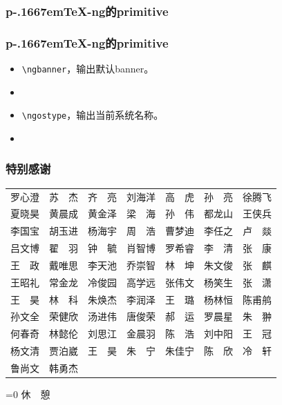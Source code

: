 \documentclass[dvipdfmx]{beamer}
\newcommand{\pTeX}{p\kern-.1667em\TeX}
\newcommand{\ptexng}{\pTeX-ng}
\begin{document}
%
\begin{frame}[fragile]
\frametitle{\bf \ptexng 的primitive}
\end{frame}
%
\begin{frame}[fragile]
\frametitle{\bf \ptexng 的primitive}
\begin{itemize}
\item \verb!\ngbanner!，输出默认banner。
\item \ngbanner
\item \verb!\ngostype!，输出当前系统名称。
\item \ngostype
\end{itemize}
\end{frame}
%
\begin{frame}[fragile]
\frametitle{\bf 特别感谢}
\begin{center}
\begin{tabular}{ccccccc}
罗心澄&苏　杰&齐　亮&刘海洋&高　虎&孙　亮&徐腾飞\\
夏晓昊&黄晨成&黄金泽&梁　海&孙　伟&都龙山&王侠兵\\
李国宝&胡玉进&杨海宇&周　浩&曹梦迪&李任之&卢　燚\\
吕文博&翟　羽&钟　毓&肖智博&罗希睿&李　清&张　康\\
王　政&戴唯思&李天池&乔崇智&林　坤&朱文俊&张　麒\\
王昭礼&常金龙&冷俊园&高学远&张伟文&杨笑生&张　潇\\
王　昊&林　科&朱焕杰&李润泽&王　璐&杨林恒&陈甫鸼\\
孙文全&荣健欣&汤进伟&唐俊荣&郝　运&罗晨星&朱　翀\\
何春奇&林懿伦&刘思江&金晨羽&陈　浩&刘中阳&王　冠\\
杨文清&贾泊崴&王　昊&朱　宁&朱佳宁&陈　欣&冷　轩\\
鲁尚文&韩勇杰&&&&&\\
\end{tabular}
\end{center}
\end{frame}
%
\begin{frame}[fragile]
\begin{center}
\ifnum{}=0
\Huge 休　憩
\fi
\end{center}
\end{frame}
\end{document}
